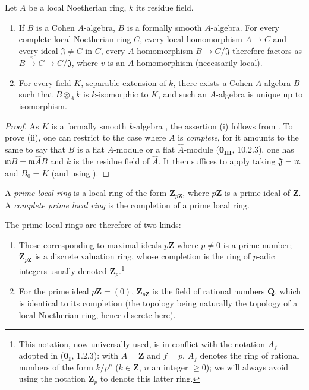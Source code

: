 \begin{theorem}[19.8.2]
\label{0.19.8.2}
Let $A$ be a local Noetherian ring, $k$ its residue field.
\begin{enumerate}
  \item[\rm(i)] If $B$ is a Cohen $A$-algebra, $B$ is a formally smooth $A$-algebra.
For every complete local Noetherian ring $C$, every local homomorphism $A\to C$ and every ideal $\mathfrak{J}\neq C$ in $C$, every $A$-homomorphism $B\to C/\mathfrak{J}$ therefore factors as $B\xrightarrow{v}C\to C/\mathfrak{J}$, where $v$ is an $A$-homomorphism (necessarily local).
  \item[\rm(ii)] For every field $K$, separable extension of $k$, there exists a Cohen $A$-algebra $B$ such that $B\otimes_A k$ is $k$-isomorphic to $K$, and such an $A$-algebra is unique up to isomorphism.
\end{enumerate}
\end{theorem}

\begin{proof}
As $K$ is a formally smooth $k$-algebra , the assertion (i) follows from .
To prove (ii), one can restrict to the case where $A$ is \emph{complete}, for it amounts to the same to say that $B$ is a flat $A$-module or a flat $\widehat{A}$-module ($\mathbf{0_{III}}$, 10.2.3), one has $\mathfrak{m}B=\mathfrak{m}\widehat{A}B$ and $k$ is the residue field of $\widehat{A}$.
It then suffices to apply  taking $\mathfrak{J}=\mathfrak{m}$ and $B_0=K$ (and using ).
\end{proof}

\begin{definition}[19.8.3]
\label{0.19.8.3}
A \emph{prime local ring} is a local ring of the form $\mathbf{Z}_{p\mathbf{Z}}$, where $p\mathbf{Z}$ is a prime ideal of $\mathbf{Z}$.
A \emph{complete prime local ring} is the completion of a prime local ring.
\end{definition}

The prime local rings are therefore of two kinds:
\begin{enumerate}
  \item[$1^\circ$] Those corresponding to maximal ideals $p\mathbf{Z}$ where $p\neq 0$ is a prime number; $\mathbf{Z}_{p\mathbf{Z}}$ is a discrete valuation ring, whose completion is the ring of $p$-adic integers usually denoted $\mathbf{Z}_p$.\footnote{This notation, now universally used, is in conflict with the notation $A_f$ adopted in ($\mathbf{0_I}$, 1.2.3): with $A=\mathbf{Z}$ and $f=p$, $A_f$ denotes the ring of rational numbers of the form $k/p^n$ ($k\in\mathbf{Z}$, $n$ an integer $\geq 0$); we will always avoid using the notation $\mathbf{Z}_p$ to denote this latter ring.}
  \item[$2^\circ$] For the prime ideal $p\mathbf{Z}=(0)$, $\mathbf{Z}_{p\mathbf{Z}}$ is the field of rational numbers $\mathbf{Q}$, which is identical to its completion (the topology being naturally the topology of a local Noetherian ring, hence discrete here).
\end{enumerate}

